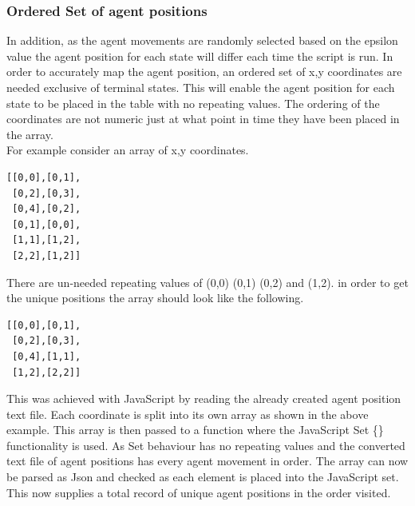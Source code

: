 \subsubsection{Ordered Set of agent positions}
In addition, as the agent movements are randomly selected based on the epsilon value the agent position for each state will differ each time the script is run. In order to accurately map the agent position, an ordered set of x,y coordinates are needed exclusive of terminal states. This will enable the agent position for each state to be placed in the table with no repeating values. The ordering of the coordinates are not numeric just at what point in time they have been placed in the array.\\
For example consider an array of x,y coordinates.
\begin{verbatim}
[[0,0],[0,1],
 [0,2],[0,3],
 [0,4],[0,2],
 [0,1],[0,0],
 [1,1],[1,2],
 [2,2],[1,2]]
\end{verbatim}
There are un-needed repeating values of (0,0) (0,1) (0,2) and (1,2).
in order to get the unique positions the array should look like the following.\\
\begin{verbatim}
[[0,0],[0,1],
 [0,2],[0,3],
 [0,4],[1,1],
 [1,2],[2,2]]
\end{verbatim}
This was achieved with JavaScript by reading the already created agent position text file. Each coordinate is split into its own array as shown in the above example. This array is then passed to a function where the JavaScript Set \{\} functionality is used. As Set behaviour has no repeating values and the converted text file of agent positions has every agent movement in order. The array can now be parsed as Json and checked as each element is placed into the JavaScript set. This now supplies a total record of unique agent positions in the order visited.
